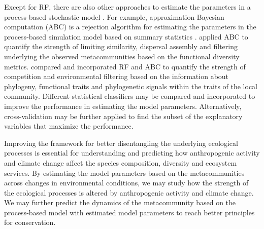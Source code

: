 	Except for RF, there are also other approaches to estimate the parameters in a process-based stochastic model \citep{hartig2011statistical}. For example, approximation Bayesian computation (ABC) is a rejection algorithm for estimating the parameters in the process-based simulation model based on summary statistics \citep{csillery2010approximate}. \citet{van2015new} applied ABC to quantify the strength of limiting similarity, dispersal assembly and filtering underlying the observed metacommunities based on the functional diversity metrics. \citet{ruffley2019identifying} compared and incorporated RF and ABC to quantify the strength of competition and environmental filtering based on the information about phylogeny, functional traits and phylogenetic signals within the traits of the local community. Different statistical classifiers may be compared and incorporated to improve the performance in estimating the model parameters. Alternatively, cross-validation may be further applied to find the subset of the explanatory variables that maximize the performance.
	
	Improving the framework for better disentangling the underlying ecological processes is essential for understanding and predicting how anthropogenic activity and climate change affect the species composition, diversity and ecosystem services. By estimating the model parameters based on the metacommunities across changes in environmental conditions, we may study how the strength of the ecological processes is altered by anthropogenic activity and climate change. We may further predict the dynamics of the metacommunity based on the process-based model with estimated model parameters to reach better principles for conservation.
	
